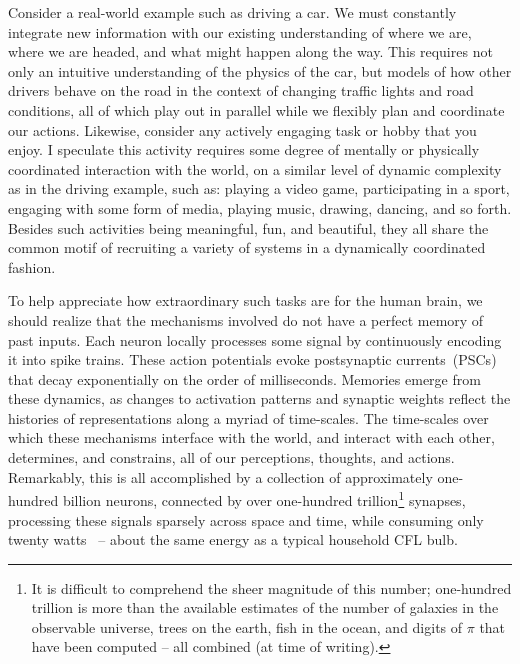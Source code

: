 Consider a real-world example such as driving a car. We must constantly integrate new information with our existing understanding of where we are, where we are headed, and what might happen along the way.
This requires not only an intuitive understanding of the physics of the car, but models of how other drivers behave on the road in the context of changing traffic lights and road conditions, all of which play out in parallel while we flexibly plan and coordinate our actions.
Likewise, consider any actively engaging task or hobby that you enjoy.
I speculate this activity requires some degree of mentally or physically coordinated interaction with the world, on a similar level of dynamic complexity as in the driving example, such as: playing a video game, participating in a sport, engaging with some form of media, playing music, drawing, dancing, and so forth.
Besides such activities being meaningful, fun, and beautiful, they all share the common motif of recruiting a variety of systems in a dynamically coordinated fashion.

To help appreciate how extraordinary such tasks are for the human brain, we should realize that the mechanisms involved do not have a perfect memory of past inputs.
Each neuron locally processes some signal by continuously encoding it into spike trains.
These action potentials evoke postsynaptic currents~(PSCs) that decay exponentially on the order of milliseconds.
Memories emerge from these dynamics, as changes to activation patterns and synaptic weights reflect the histories of representations along a myriad of time-scales.
The time-scales over which these mechanisms interface with the world, and interact with each other, determines, and constrains, all of our perceptions, thoughts, and actions.
Remarkably, this is all accomplished by a collection of approximately one-hundred billion neurons, connected by over one-hundred trillion\footnote{%
It is difficult to comprehend the sheer magnitude of this number; one-hundred trillion is more than the available estimates of the number of galaxies in the observable universe, trees on the earth, fish in the ocean, and digits of $\pi$ that have been computed -- all combined (at time of writing).
}
synapses, processing these signals sparsely across space and time, while consuming only twenty watts~\citep{koch2014} -- about the same energy as a typical household CFL bulb.

